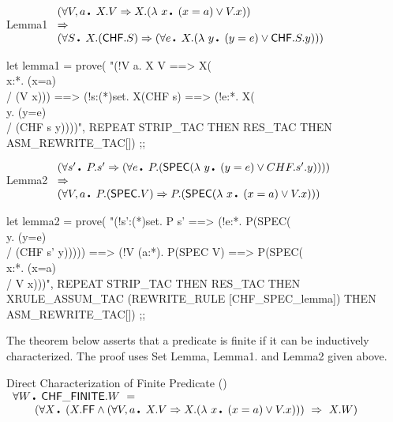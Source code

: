 \begin{theorem}{Lemma1}
\Eline
$\begin{array}{l}
  (\qA V,a\Dot  X.V \IMP X.(\lambda\ x\Dot  (x=a) \OR V.x)) \\
  \IMP \\
  (\qA S\Dot X.(\CHF.S) \IMP  
      (\qA e\Dot X.(\lambda\ y\Dot (y=e) \OR \CHF.S.y)))
\end{array}$
\end{theorem}

\enddocs
{}
\endmoddef
let lemma1 = prove(
   "(!V a. X V ==> X(\\x:*. (x=a) \\/ (V x))) ==>
    (!s:(*)set. X(CHF s) ==> (!e:*. X(\\y. (y=e) \\/ (CHF s y))))",
    REPEAT STRIP_TAC
    THEN RES_TAC THEN ASM_REWRITE_TAC[]) ;;
    
\endcode
{}


\begin{theorem}{Lemma2}
\Eline
$\begin{array}{l}
 (\qA s'\Dot P.s' \IMP 
     (\qA e\Dot P.(\SPEC(\lambda\ y\Dot (y=e) \OR CHF.s'.y)))) \\
 \IMP \\
 (\qA V,a\Dot P.(\SPEC.V) \IMP P.(\SPEC(\lambda\ x\Dot (x=a) \OR V.x)))
\end{array}$
\end{theorem}

\enddocs
{}
\endmoddef
let lemma2 = prove(
   "(!s':(*)set. P s' ==> (!e:*. P(SPEC(\\y. (y=e) \\/ (CHF s' y)))))  ==>
    (!V (a:*). P(SPEC V) ==> P(SPEC(\\x:*. (x=a) \\/ V x)))",
    REPEAT STRIP_TAC
    THEN RES_TAC 
    THEN XRULE_ASSUM_TAC (REWRITE_RULE [CHF_SPEC_lemma])
    THEN ASM_REWRITE_TAC[]) ;;
\endcode
{}


The theorem below asserts that a predicate is finite if it can be
inductively characterized. The proof uses Set Lemma, Lemma1. and
Lemma2 given above.

\begin{theorem}{Direct Characterization of Finite Predicate 
()}
\label{CHFfin.def2}
\Eline
$\begin{array}{l}
  \qA W\Dot \CHFfin.W\ = \\
  \TAB(\qA X\Dot (X.\FF \AND (\qA V,a\Dot X.V \IMP 
        X.(\lambda\ x\Dot (x=a) \OR V.x))) \ \IMP \ X.W)
\end{array}$
\end{theorem}

